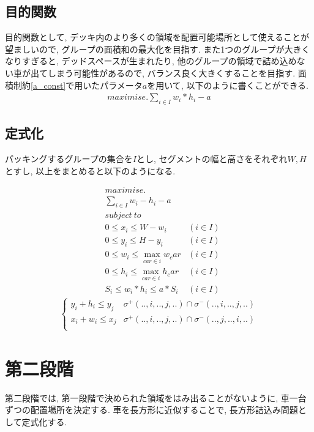 \subsection{目的関数}
目的関数として, デッキ内のより多くの領域を配置可能場所として使えることが望ましいので, グループの面積和の最大化を目指す. 
また1つのグループが大きくなりすぎると, デッドスペースが生まれたり, 他のグループの領域で詰め込めない車が出てしまう可能性があるので, バランス良く大きくすることを目指す. 
面積制約\ref{a_const}で用いたパラメータ$a$を用いて, 以下のように書くことができる. \\
\begin{eqnarray}
    maximise. \sum_{i \in I} w_i*h_i  - a
\end{eqnarray}
\subsection{定式化}
パッキングするグループの集合を$I$とし, セグメントの幅と高さをそれぞれ$W, H$とすし, 以上をまとめると以下のようになる. \\
\begin{center}
    \begin{align}
        & maximise. \nonumber \\
        & \sum_{i \in I} w_i - h_i - a \\
        & subject\  to \nonumber \\
        & 0 \leq x_i \leq W - w_i & (i \in I) \\
        & 0 \leq y_i \leq H - y_i & (i \in I) \\
        & 0 \leq w_i \leq \max_{car \in i}w_car & (i \in I) \\
        & 0 \leq h_i \leq \max_{car \in i}h_car & (i \in I) \\
        & S_i \leq w_i*h_i \leq a*S_i &(i \in I)
    \end{align}
    \begin{eqnarray}
        \left\{
            \begin{array}{ll}
                y_i + h_i \leq y_j & \sigma^+(..,i,..,j,..) \cap \sigma^-(..,i,..,j,..) \\
                x_i + w_i \leq x_j & \sigma^+(..,i,..,j,..) \cap \sigma^-(..,j,..,i,..) \\
            \end{array}
        \right.
    \end{eqnarray}
\end{center}

\section{第二段階}
第二段階では, 第一段階で決められた領域をはみ出ることがないように, 車一台ずつの配置場所を決定する. 
車を長方形に近似することで, 長方形詰込み問題として定式化する. 

